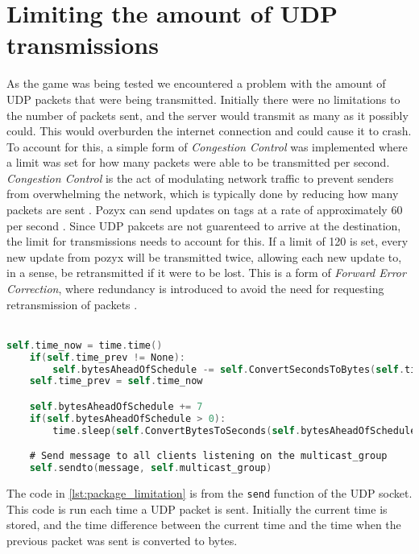 \section{Limiting the amount of UDP transmissions}\label{sec:sprint5-transmissionlimit}
As the game was being tested we encountered a problem with the amount of UDP packets that were being transmitted.
Initially there were no limitations to the number of packets sent, and the server would transmit as many as it possibly could.
This would overburden the internet connection and could cause it to crash.
To account for this, a simple form of \textit{Congestion Control} was implemented where a limit was set for how many packets were able to be transmitted per second.
\textit{Congestion Control} is the act of modulating network traffic to prevent senders from overwhelming the network, which is typically done by reducing how many packets are sent \cite{CongestionControl}.
Pozyx can send updates on tags at a rate of approximately 60 per second \cite{pozyx-Performance}.
Since UDP pakcets are not guarenteed to arrive at the destination, the limit for transmissions needs to account for this.
If a limit of 120 is set, every new update from pozyx will be transmitted twice, allowing each new update to, in a sense, be retransmitted if it were to be lost.
This is a form of \textit{Forward Error Correction}, where redundancy is introduced to avoid the need for requesting retransmission of packets \cite{ForwardErrorCorrection}.
\\\\
\begin{lstlisting}[caption={Implementaion of the limit on the amount of packets that can be sent per second}, captionpos=b,language=C,label={lst:package_limitation}]
    self.time_now = time.time()
    if(self.time_prev != None):
        self.bytesAheadOfSchedule -= self.ConvertSecondsToBytes(self.time_now - self.time_prev)
    self.time_prev = self.time_now

    self.bytesAheadOfSchedule += 7
    if(self.bytesAheadOfSchedule > 0):
        time.sleep(self.ConvertBytesToSeconds(self.bytesAheadOfSchedule))

    # Send message to all clients listening on the multicast_group
    self.sendto(message, self.multicast_group)
\end{lstlisting}
The code in \autoref{lst:package_limitation} is from the \texttt{send} function of the UDP socket.
This code is run each time a UDP packet is sent.
Initially the current time is stored, and the time difference between the current time and the time when the previous packet was sent is converted to bytes.
